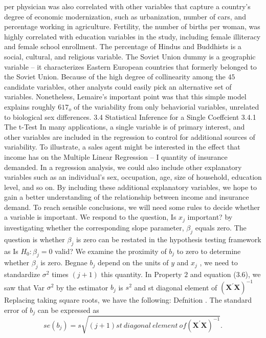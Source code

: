\documentclass[11pt]{article}
\begin{document}
per physician was also correlated with other variables that capture a country's
degree of economic modernization, such as urbanization, number of cars, and
 percentage working in agriculture. Fertility, the number of births per woman, was
 highly correlated with education variables in the study, including female illiteracy
and female school enrollment. The percentage of Hindus and Buddhists is a
 social, cultural, and religious variable. The Soviet Union dummy is a geographic
variable -- it characterizes Eastern European countries that formerly belonged
to the Soviet Union. Because of the high degree of collinearity among the \(4 5\)
 candidate variables, other analysts could easily pick an alternative set of variables.
Nonetheless, Lemaire's important point was that this simple model explains
roughly \(6 1 7_{o}\) of the variability from only behaviorial variables, unrelated to
 biological sex differences.
3.4 Statistical Inference for a Single Coeffcient
3.4.1 The t-Test
In many applications, a single variable is of primary interest, and other variables
 are included in the regression to control for additional sources of variability. To
illustrate, a sales agent might be interested in the effect that income has on the
 Multiple Linear Regression -- I
quantity of insurance demanded. In a regression analysis, we could also include
other explanatory variables such as an individual's sex, occupation, age, size of
household, education level, and so on. By including these additional explanatory
variables, we hope to gain a better understanding of the relationship between
 income and insurance demand. To reach sensible conclusions, we will need some
rules to decide whether a variable is important.
We respond to the question, Is \(x_{j}\) important? by investigating whether the
corresponding slope parameter, \(\beta_{j}\) equals zero. The question is whether \(\beta_{j}\) is
 zero can be restated in the hypothesis testing framework as  Is \(H_{0} : \beta_{j}=0\)
valid?
We examine the proximity of \(b_{j}\) to zero to determine whether \(\beta_{j}\) is zero.
Begnae \(b_{j}\) depend on the units of \(y\) and \(x_{j}\) , we need to standardize \(\sigma^{2}\) times
\(( j+1 )\) this quantity. In Property \(2\) and equation (3.6), we saw that Var \(\sigma^{2}\) by the estimator \(b_{j}\) is \(s^{2}\) and
st diagonal element of \(\left( \mathbf{X}^{\prime} \mathbf{X} \right)^{-1}\) Replacing
taking square roots, we have the following:
Defnition . The standard error of \(b_{j}\) can be expressed as
\[
s e ( b_{j} )=s \sqrt{( j+1 ) s t \ d i a g o n a l \ e l e m e n t \ o f \left( \mathbf{X^{\prime} X} \right)^{-1}} .
\]
\end{document}
